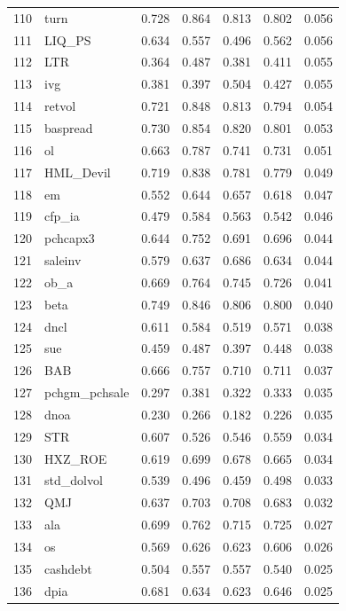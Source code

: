 \begin{footnotesize}
\begin{longtable}{rl|c|c|c|c|c}
		110 & turn & 0.728 & 0.864 & 0.813 & 0.802 & 0.056 \\ 
		111 & LIQ\_PS & 0.634 & 0.557 & 0.496 & 0.562 & 0.056 \\ 
		112 & LTR & 0.364 & 0.487 & 0.381 & 0.411 & 0.055 \\ 
		113 & ivg & 0.381 & 0.397 & 0.504 & 0.427 & 0.055 \\ 
		114 & retvol & 0.721 & 0.848 & 0.813 & 0.794 & 0.054 \\ 
		115 & baspread & 0.730 & 0.854 & 0.820 & 0.801 & 0.053 \\ 
		116 & ol & 0.663 & 0.787 & 0.741 & 0.731 & 0.051 \\ 
		117 & HML\_Devil & 0.719 & 0.838 & 0.781 & 0.779 & 0.049 \\ 
		118 & em & 0.552 & 0.644 & 0.657 & 0.618 & 0.047 \\ 
		119 & cfp\_ia & 0.479 & 0.584 & 0.563 & 0.542 & 0.046 \\ 
		120 & pchcapx3 & 0.644 & 0.752 & 0.691 & 0.696 & 0.044 \\ 
		121 & saleinv & 0.579 & 0.637 & 0.686 & 0.634 & 0.044 \\ 
		122 & ob\_a & 0.669 & 0.764 & 0.745 & 0.726 & 0.041 \\ 
		123 & beta & 0.749 & 0.846 & 0.806 & 0.800 & 0.040 \\ 
		124 & dncl & 0.611 & 0.584 & 0.519 & 0.571 & 0.038 \\ 
		125 & sue & 0.459 & 0.487 & 0.397 & 0.448 & 0.038 \\ 
		126 & BAB & 0.666 & 0.757 & 0.710 & 0.711 & 0.037 \\ 
		127 & pchgm\_pchsale & 0.297 & 0.381 & 0.322 & 0.333 & 0.035 \\ 
		128 & dnoa & 0.230 & 0.266 & 0.182 & 0.226 & 0.035 \\ 
		129 & STR & 0.607 & 0.526 & 0.546 & 0.559 & 0.034 \\ 
		130 & HXZ\_ROE & 0.619 & 0.699 & 0.678 & 0.665 & 0.034 \\ 
		131 & std\_dolvol & 0.539 & 0.496 & 0.459 & 0.498 & 0.033 \\ 
		132 & QMJ & 0.637 & 0.703 & 0.708 & 0.683 & 0.032 \\ 
		133 & ala & 0.699 & 0.762 & 0.715 & 0.725 & 0.027 \\ 
		134 & os & 0.569 & 0.626 & 0.623 & 0.606 & 0.026 \\ 
		135 & cashdebt & 0.504 & 0.557 & 0.557 & 0.540 & 0.025 \\ 
		136 & dpia & 0.681 & 0.634 & 0.623 & 0.646 & 0.025 \\ 

\end{longtable}
\end{footnotesize}
